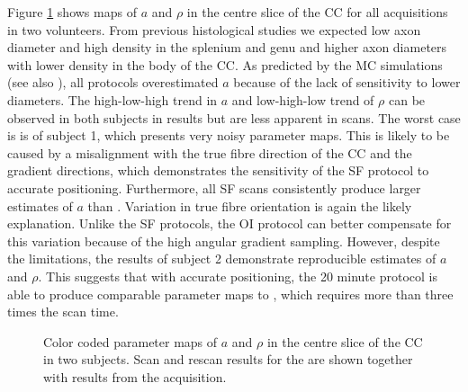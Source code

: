 Figure \ref{fig:maps} shows maps of $a$ and $\rho$ in the centre slice of the CC for all acquisitions in two volunteers. From previous histological studies \cite{aboitiz1992} we expected low axon diameter and high density in the splenium and genu and higher axon diameters with lower density in the body of the CC. As predicted by the MC simulations (see also \cite{alexander2009}), all protocols overestimated $a$ because of the lack of sensitivity to lower diameters. The high-low-high trend in $a$ and low-high-low trend of $\rho$ can be observed in both subjects in \OIlong{} results but are less apparent in \SFshort{} scans. The worst case is is \SFshort{} of subject 1, which presents very noisy parameter maps. This is likely to be caused by a misalignment with the true fibre direction of the CC and the gradient directions, which demonstrates the sensitivity of the SF protocol to accurate positioning. Furthermore, all SF scans consistently produce larger estimates of $a$ than \OIlong{}. Variation in true fibre orientation is again the likely explanation. Unlike the SF protocols, the OI protocol can better compensate for this variation because of the high angular gradient sampling. However, despite the limitations, the results of subject 2 demonstrate reproducible estimates of $a$ and $\rho$. This suggests that with accurate positioning, the 20 minute \SFshort{} protocol is able to produce comparable parameter maps to \OIlong, which requires more than three times the scan time.
\begin{figure}
 \centering
  \caption{Color coded parameter maps of $a$ and $\rho$ in the centre slice of the CC in two subjects. Scan and rescan results for the \SFshort{} are shown together with results from the \OIlong{} acquisition.}
  \label{fig:maps}
\end{figure}
